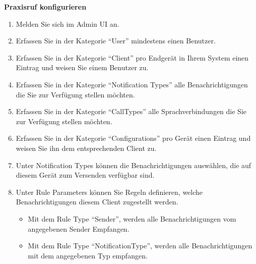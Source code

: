 \textbf{Praxisruf konfigurieren}
\begin{enumerate}
    \item Melden Sie sich im Admin UI an.
    \item Erfassen Sie in der Kategorie ``User'' mindestens einen Benutzer.
    \item Erfassen Sie in der Kategorie ``Client'' pro Endgerät in Ihrem System einen Eintrag und weisen Sie einem Benutzer zu.
    \item Erfassen Sie in der Kategorie ``Notification Types'' alle Benachrichtigungen die Sie zur Verfügung stellen möchten.
    \item Erfassen Sie in der Kategorie ``CallTypes'' alle Sprachverbindungen die Sie zur Verfügung stellen möchten.
    \item Erfassen Sie in der Kategorie ``Configurations'' pro Gerät einen Eintrag und weisen Sie ihn dem entsprechenden Client zu.
    \item Unter Notification Types können die Benachrichtigungen auswählen, die auf diesem Gerät zum Versenden verfügbar sind.
    \item Unter Rule Parameters können Sie Regeln definieren, welche Benachrichtigungen diesem Client zugestellt werden.

    \begin{itemize}
        \item Mit dem Rule Type ``Sender'', werden alle Benachrichtigungen vom angegebenen Sender Empfangen.
        \item Mit dem Rule Type ``NotificationType'', werden alle Benachrichtigungen mit dem angegebenen Typ empfangen.
    \end{itemize}
\end{enumerate}

\clearpage
